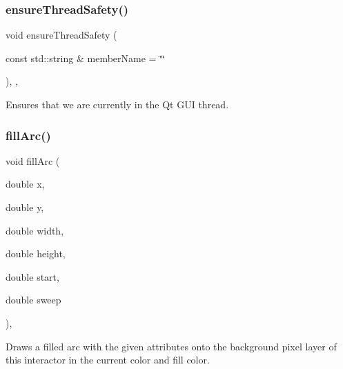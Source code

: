 \mbox{\label{classsgl_1_1GObservable_a284f31528c0520f8e545c03ac9eeac74}} 
\subsubsection{\texorpdfstring{ensure\+Thread\+Safety()}{ensureThreadSafety()}}
{\footnotesize\ttfamily void ensure\+Thread\+Safety (\begin{DoxyParamCaption}\item[{const std\+::string \&}]{member\+Name = {\ttfamily \char`\"{}\char`\"{}} }\end{DoxyParamCaption})\hspace{0.3cm}{\ttfamily [protected]}, {\ttfamily [virtual]}, {\ttfamily [inherited]}}



Ensures that we are currently in the Qt G\+UI thread. 

\mbox{\label{classsgl_1_1GDrawingSurface_a228075ad18bd97b57f9956568c4773f3}} 
\subsubsection{\texorpdfstring{fill\+Arc()}{fillArc()}}
{\footnotesize\ttfamily void fill\+Arc (\begin{DoxyParamCaption}\item[{double}]{x,  }\item[{double}]{y,  }\item[{double}]{width,  }\item[{double}]{height,  }\item[{double}]{start,  }\item[{double}]{sweep }\end{DoxyParamCaption})\hspace{0.3cm}{\ttfamily [virtual]}, {\ttfamily [inherited]}}



Draws a filled arc with the given attributes onto the background pixel layer of this interactor in the current color and fill color. 

